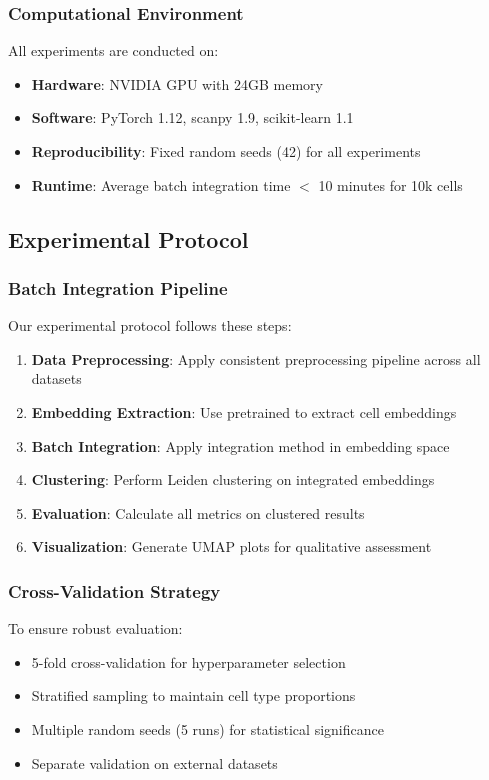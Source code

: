 \subsubsection{Computational Environment}

All experiments are conducted on:
\begin{itemize}
\item \textbf{Hardware}: NVIDIA GPU with 24GB memory
\item \textbf{Software}: PyTorch 1.12, scanpy 1.9, scikit-learn 1.1
\item \textbf{Reproducibility}: Fixed random seeds (42) for all experiments
\item \textbf{Runtime}: Average batch integration time $<$ 10 minutes for 10k cells
\end{itemize}

\subsection{Experimental Protocol}

\subsubsection{Batch Integration Pipeline}

Our experimental protocol follows these steps:

\begin{enumerate}
\item \textbf{Data Preprocessing}: Apply consistent preprocessing pipeline across all datasets
\item \textbf{Embedding Extraction}: Use pretrained \bioformer{} to extract cell embeddings
\item \textbf{Batch Integration}: Apply integration method in embedding space
\item \textbf{Clustering}: Perform Leiden clustering on integrated embeddings
\item \textbf{Evaluation}: Calculate all metrics on clustered results
\item \textbf{Visualization}: Generate UMAP plots for qualitative assessment
\end{enumerate}

\subsubsection{Cross-Validation Strategy}

To ensure robust evaluation:
\begin{itemize}
\item 5-fold cross-validation for hyperparameter selection
\item Stratified sampling to maintain cell type proportions
\item Multiple random seeds (5 runs) for statistical significance
\item Separate validation on external datasets
\end{itemize}

